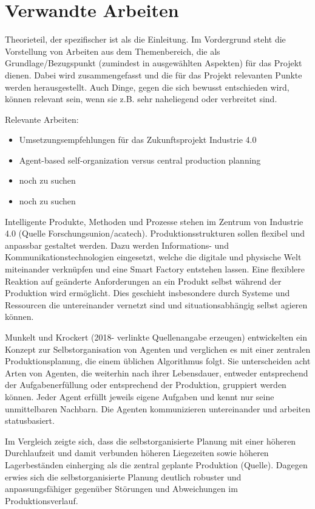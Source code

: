 \chapter{Verwandte Arbeiten}

Theorieteil, der spezifischer ist als die Einleitung. Im Vordergrund steht die Vorstellung von Arbeiten aus dem Themenbereich, die als Grundlage/Bezugspunkt (zumindest in ausgewählten Aspekten) für das Projekt dienen. Dabei wird zusammengefasst und die für das Projekt relevanten Punkte werden herausgestellt. Auch Dinge, gegen die sich bewusst entschieden wird, können relevant sein, wenn sie z.B. sehr naheliegend oder verbreitet sind.

Relevante Arbeiten:
\begin{itemize}
\item Umsetzungsempfehlungen für das Zukunftsprojekt Industrie 4.0 \parencite{arbeitsbericht}
\item Agent-based self-organization versus central production planning \autocite{agents}
\item noch zu suchen
\item noch zu suchen
\end{itemize}

Intelligente Produkte, Methoden und Prozesse stehen im Zentrum von Industrie 4.0 (Quelle Forschungsunion/acatech). Produktionsstrukturen sollen flexibel und anpassbar gestaltet werden. Dazu werden Informations- und Kommunikationstechnologien eingesetzt, welche die digitale und physische Welt miteinander verknüpfen und eine Smart Factory entstehen lassen. Eine flexiblere Reaktion auf geänderte Anforderungen an ein Produkt selbst während der Produktion wird ermöglicht. Dies geschieht insbesondere durch Systeme und Ressourcen die untereinander vernetzt sind und situationsabhängig selbst agieren können.

Munkelt und Krockert (2018- verlinkte Quellenangabe erzeugen) entwickelten ein Konzept zur Selbstorganisation von Agenten und verglichen es mit einer zentralen Produktionsplanung, die einem üblichen Algorithmus folgt. Sie unterscheiden acht Arten von Agenten, die weiterhin nach ihrer Lebensdauer, entweder entsprechend der Aufgabenerfüllung oder entsprechend der Produktion, gruppiert werden können. Jeder Agent erfüllt jeweils eigene Aufgaben und kennt nur seine unmittelbaren Nachbarn. Die Agenten kommunizieren untereinander und arbeiten statusbasiert.

Im Vergleich zeigte sich, dass die selbstorganisierte Planung mit einer höheren Durchlaufzeit und damit verbunden höheren Liegezeiten sowie höheren Lagerbeständen einherging als die zentral geplante Produktion (Quelle). Dagegen erwies sich die selbstorganisierte Planung deutlich robuster und anpassungsfähiger gegenüber Störungen und Abweichungen im Produktionsverlauf.

